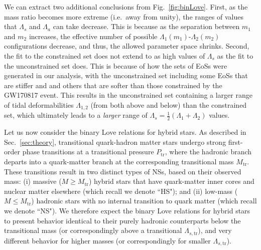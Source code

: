 \documentclass[prd,twocolumn,nofootinbib,superscriptaddress,amsmath,amssymb]{revtex4-1}
\begin{document}
We can extract two additional conclusions from Fig.~\ref{fig:binLove}. First, as the mass ratio becomes more extreme (i.e.~away from unity), the ranges of values that $\Lambda_s$ and $\Lambda_a$ can take decrease. This is because as the separation between $m_1$ and $m_2$ increases, the effective number of possible $\Lambda_1(m_1)$-$\Lambda_2(m_2)$ configurations decrease, and thus, the allowed parameter space shrinks. Second, the fit to the constrained set does not extend to as high values of $\Lambda_s$ as the fit to the unconstrained set does. This is because of how the sets of EoSs were generated in our analysis, with the unconstrained set including some EoSs that are stiffer and and others that are softer than those constrained by the GW170817 event. This results in the unconstrained set  containing a larger range of tidal deformabilities $\Lambda_{1,2}$ (from both above and below) than the constrained set, which ultimately leads to a \emph{larger} range of $\Lambda_s=\frac{1}{2}(\Lambda_1+\Lambda_2)$ values.

Let us now consider the binary Love relations for hybrid stars. As described in Sec.~\ref{sec:theory}, transitional quark-hadron matter stars undergo strong first-order phase transitions at a transitional pressure $P_{\text{tr}}$, where the hadronic branch departs into a quark-matter branch at the corresponding transitional mass $M_{\text{tr}}$. These transitions result in two distinct types of NSs, based on their observed mass: (i) massive ($M \geq M_{\text{tr}}$) hybrid stars that have quark-matter inner cores and nuclear matter elsewhere (which recall we denote ``HS"); and (ii) low-mass ($M \leq M_{\text{tr}}$) hadronic stars with no internal transition to quark matter (which recall we denote ``NS"). We therefore expect the binary Love relations for hybrid stars to present behavior identical to their purely hadronic counterparts below the transitional mass (or correspondingly above a transitional $\Lambda_{s,\textrm{tr}}$), and very different behavior for higher masses (or correspondingly for smaller $\Lambda_{s,\textrm{tr}}$). 
\end{document}
